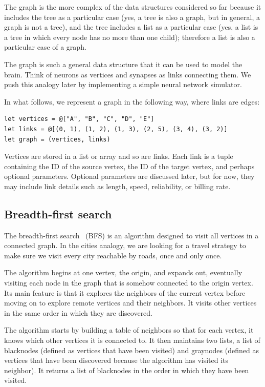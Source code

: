 \documentclass[justified, sixbynine]{tufte-book}
\theoremstyle{plain}%
\newtheorem * {corollary}{Corollary}
\theoremstyle{definition}
\theoremstyle{remark}
\newtheorem * {remark}{Remark}
\newtheorem * {note}{Note}
\begin{document}
\begin{fullwidth}
The graph is the more complex of the data structures considered so far because it includes the tree as a particular case (yes, a tree is also a graph, but in general, a graph is not a tree), and the tree includes a list as a particular case (yes, a list is a tree in which every node has no more than one child); therefore a list is also a particular case of a graph.

The graph is such a general data structure that it can be used to model the brain. Think of neurons as vertices and synapses as links connecting them. We push this analogy later by implementing a simple neural network simulator.

In what follows, we represent a graph in the following way, where links are edges:

\begin{lstlisting}
let vertices = @["A", "B", "C", "D", "E"]
let links = @[(0, 1), (1, 2), (1, 3), (2, 5), (3, 4), (3, 2)]
let graph = (vertices, links)
\end{lstlisting}

Vertices are stored in a list or array and so are links. Each link is a tuple containing the ID of the source vertex, the ID of the target vertex, and perhaps optional parameters.  Optional parameters are discussed later, but for now, they may include link details such as length, speed, reliability, or billing rate.

\subsection{Breadth-first search}


The breadth-first search~\cite{bfs} (BFS) is an algorithm designed to visit all vertices in a connected graph. In the cities analogy, we are looking for a travel strategy to make sure we visit every city reachable by roads, once and only once.

The algorithm begins at one vertex, the origin, and expands out, eventually visiting each node in the graph that is somehow connected to the origin vertex. Its main feature is that it explores the neighbors of the current vertex before moving on to explore remote vertices and their neighbors. It visits other vertices in the same order in which they are discovered.

The algorithm starts by building a table of neighbors so that for each vertex, it knows which other vertices it is connected to. It then maintains two lists, a list of blacknodes (defined as vertices that have been visited) and graynodes (defined as vertices that have been discovered because the algorithm has visited its neighbor). It returns a list of blacknodes in the order in which they have been visited.


\end{fullwidth}
\end{document}
